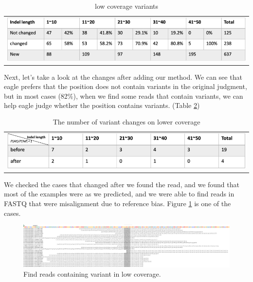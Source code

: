 \vspace{1cm}
\begin{table}[h]
    \centering
    \caption[low coverage variants]{low coverage variants}
    \vspace{-0.5cm}
    \begin{tabular}{c}
        \includegraphics[width=1\textwidth]{body/image/t4-2.png}
    \end{tabular}
    \label{t4-2}
\end{table}

Next, let’s take a look at the changes after adding our method. We can see that eagle prefers that the position does not contain variants in the original judgment, but in most cases (82\%), when we find some reads that contain variants, we can help eagle judge whether the position contains variants. (Table \ref{t4-3})

\vspace{1cm}
\begin{center}
\begin{table}[h]
    \centering
    \caption{The number of variant changes on lower coverage}
    \vspace{-0.5cm}
    \begin{tabular}{c}
        \includegraphics[width=1\textwidth]{body/image/t4-3.png}
    \end{tabular}
    \label{t4-3}
\end{table}
\end{center}

We checked the cases that changed after we found the read, and we found that most of the examples were as we predicted, and we were able to find reads in FASTQ that were misalignment due to reference bias. Figure \ref{f4-3} is one of the cases.

\vspace{1cm}
\begin{figure}[H]
    \centering
    \includegraphics[width=1\columnwidth]{body/image/4-3.png}
    \captionsetup{labelfont=bf}
    \renewcommand{\baselinestretch}{1.0}
    \vspace{-1cm}
    \caption[Find variant reads in low coverage]{Find reads containing variant in low coverage.}
    \label{f4-3}
\end{figure}

